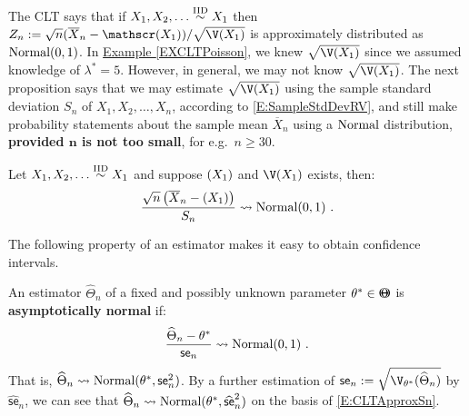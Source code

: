 The CLT says that if $X_1,X_2,\ldots \overset{{\rm IID}}{\sim} X_1$ then $Z_n := \sqrt{n}(\overline{X}_n-\E(X_1))/\sqrt{\V(X_1)}$ is approximately distributed as $\mbox{{\rm Normal}}(0,1)$.  In \hyperref[EXCLTPoisson]{Example \ref*{EXCLTPoisson}}, we knew $\sqrt{\V(X_1)}$ since we assumed knowledge of $\lambda^*=5$.   However, in general, we may not know $\sqrt{\V(X_1)}$.  The next proposition says that we may estimate $\sqrt{\V(X_1)}$ using the sample standard deviation $S_n$ of $X_1,X_2,\ldots,X_n$, according to \eqref{E:SampleStdDevRV}, and still make probability statements about the sample mean $\overline{X}_n$ using a $\mbox{{\rm Normal}}$ distribution, {\bf provided $\mathbf{n}$ is not too small}, for e.g.~$n \geq 30$.
\begin{prop}
Let $X_1,X_2,\ldots \overset{{\rm IID}}{\sim} X_1$ and suppose $\mathscr{(}X_1)$ and $\V(X_1)$ exists, then:
\begin{equation}\label{E:CLTApproxSn}
\frac{\sqrt{n} \left( \overline{X}_n - \mathscr{(}X_1) \right)}{S_n} \rightsquigarrow \mbox{{\rm Normal}}(0,1) \ .
\end{equation}
\end{prop}

The following property of an estimator makes it easy to obtain confidence intervals.
\begin{definition}
An estimator $\widehat{\Theta}_n$ of a fixed and possibly unknown parameter $\theta^* \in {\Theta}\mspace{-11 mu}{\Theta}$ is {\bf asymptotically normal} if:
\begin{equation}\label{E:AsymptoticNormalEstimator}
\frac{\widehat{\Theta}_n - \theta^*}{\mathsf{se}_n} \rightsquigarrow \mbox{{\rm Normal}}(0,1) \ .
\end{equation} 
That is, $\widehat{\Theta}_n \rightsquigarrow \mbox{{\rm Normal}}(\theta^*,\mathsf{se}_n^2)$.  By a further estimation of $\mathsf{se}_n := \sqrt{\V_{\theta^*}(\widehat{\Theta}_n)}$ by $\widehat{\mathsf{se}}_n$, we can see that $\widehat{\Theta}_n \rightsquigarrow \mbox{{\rm Normal}}(\theta^*,\widehat{\mathsf{se}}_n^2)$ on the basis of \eqref{E:CLTApproxSn}.
\end{definition}

